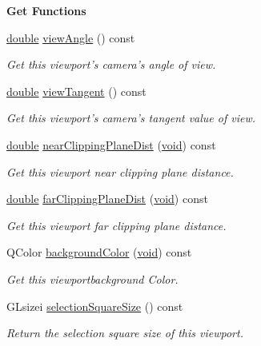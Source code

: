 \begin{Indent}{\bf Get Functions}
\begin{DoxyCompactItemize}
\hyperlink{_super_l_u_support_8h_a8956b2b9f49bf918deed98379d159ca7}{double} \hyperlink{class_g_l_c___viewport_a28a2e060b3542f6eedd0f623574165cc}{view\-Angle} () const 
\begin{DoxyCompactList}\small\item\em Get this viewport's camera's angle of view. \end{DoxyCompactList}\item 
\hyperlink{_super_l_u_support_8h_a8956b2b9f49bf918deed98379d159ca7}{double} \hyperlink{class_g_l_c___viewport_ab330e77a419089879581645e275a10e9}{view\-Tangent} () const 
\begin{DoxyCompactList}\small\item\em Get this viewport's camera's tangent value of view. \end{DoxyCompactList}\item 
\hyperlink{_super_l_u_support_8h_a8956b2b9f49bf918deed98379d159ca7}{double} \hyperlink{class_g_l_c___viewport_adde14bbae57a415181f7589867b392b6}{near\-Clipping\-Plane\-Dist} (\hyperlink{group___u_a_v_objects_plugin_ga444cf2ff3f0ecbe028adce838d373f5c}{void}) const 
\begin{DoxyCompactList}\small\item\em Get this viewport near clipping plane distance. \end{DoxyCompactList}\item 
\hyperlink{_super_l_u_support_8h_a8956b2b9f49bf918deed98379d159ca7}{double} \hyperlink{class_g_l_c___viewport_a041c5a0b36a4f3d42562ae3fbde06ff3}{far\-Clipping\-Plane\-Dist} (\hyperlink{group___u_a_v_objects_plugin_ga444cf2ff3f0ecbe028adce838d373f5c}{void}) const 
\begin{DoxyCompactList}\small\item\em Get this viewport far clipping plane distance. \end{DoxyCompactList}\item 
Q\-Color \hyperlink{class_g_l_c___viewport_a7f4c17c5bcce2a2ccc0c6c776de401ff}{background\-Color} (\hyperlink{group___u_a_v_objects_plugin_ga444cf2ff3f0ecbe028adce838d373f5c}{void}) const 
\begin{DoxyCompactList}\small\item\em Get this viewportbackground Color. \end{DoxyCompactList}\item 
G\-Lsizei \hyperlink{class_g_l_c___viewport_ad1c86dcc337a32f1df709fa36659cc8b}{selection\-Square\-Size} () const 
\begin{DoxyCompactList}\small\item\em Return the selection square size of this viewport. \end{DoxyCompactList}\item 

\end{DoxyCompactItemize}
\end{Indent}
